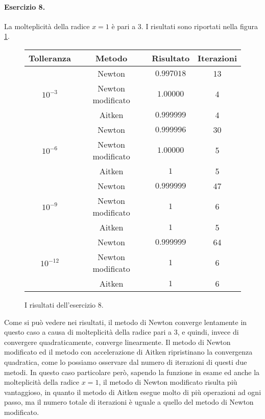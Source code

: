 \paragraph{Esercizio 8.} La molteplicità della radice $x = 1$ è pari a 3. I risultati sono riportati nella figura \ref{fig:esercizio8}.

\begin{figure}
  \centering
  \begin{tabular}{ |c|c|c|c| }
    \hline
    Tolleranza & Metodo & Risultato & Iterazioni \\
    \hline\hline
    
    \multirow{3}{4em}{\[ 10^{-3} \]} & Newton & $0.997018$ & 13 \\
    \cline{2-4}
    & Newton modificato & $1.00000$ & 4 \\
    \cline{2-4}
    & Aitken & $0.999999$ & 4 \\
    \hline\hline
    
    \multirow{3}{4em}{\[ 10^{-6} \]} & Newton & $0.999996$ & 30 \\
    \cline{2-4}
    & Newton modificato & $1.00000$ & 5 \\
    \cline{2-4}
    & Aitken & $1$ & 5 \\
    \hline\hline
    
    \multirow{3}{4em}{\[ 10^{-9} \]} & Newton & $0.999999$ & 47 \\
    \cline{2-4}
    & Newton modificato & $1$ & 6 \\
    \cline{2-4}
    & Aitken & $1$ & 5 \\
    \hline\hline
    
    \multirow{3}{4em}{\[ 10^{-12} \]} & Newton & $0.999999$ & 64 \\
    \cline{2-4}
    & Newton modificato & $1$ & 6 \\
    \cline{2-4}
    & Aitken & $1$ & 6 \\
    \hline
  \end{tabular}
  \caption{I risultati dell'esercizio 8.}
  \label{fig:esercizio8}
\end{figure}

Come si può vedere nei risultati, il metodo di Newton converge lentamente in questo caso a causa di molteplicità della radice pari a 3, e quindi, invece di convergere quadraticamente, converge linearmente. Il metodo di Newton modificato ed il metodo con accelerazione di Aitken ripristinano la convergenza quadratica, come lo possiamo osservare dal numero di iterazioni di questi due metodi. In questo caso particolare però, sapendo la funzione in esame ed anche la molteplicità della radice $x = 1$, il metodo di Newton modificato risulta più vantaggioso, in quanto il metodo di Aitken esegue molto di più operazioni ad ogni passo, ma il numero totale di iterazioni è uguale a quello del metodo di Newton modificato.
